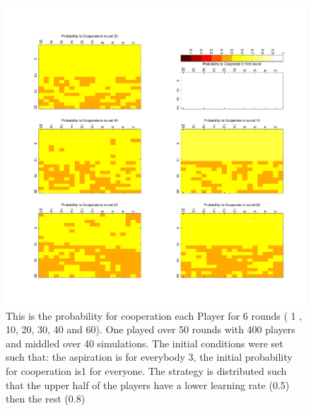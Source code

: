 \documentclass[11pt]{article}
\begin{document}
\begin{figure}
\centering
\includegraphics[scale=0.6]{ProbabilityToCooperateInDiffRound30.pdf}
\caption[]{This is the probability for cooperation each Player for 6 rounds ( 1 , 10, 20, 30, 40 and 60). One played over 50 rounds with 400 players and middled over 40 simulations. The initial conditions were set such that: the aspiration is for everybody 3, the initial probability for cooperation is1 for everyone. The strategy is distributed such that the upper half of the players have a lower learning rate (0.5) then the rest (0.8) }
\label{exp30}
\end{figure}
\end{document}
